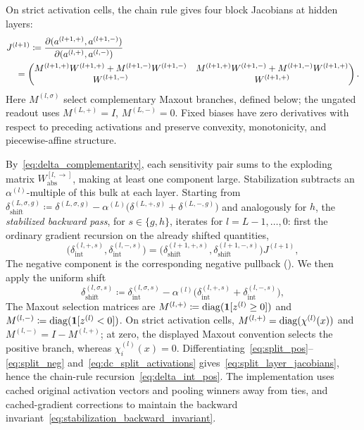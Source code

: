 On strict activation cells, the chain rule gives four block Jacobians at hidden layers:
\begin{equation}
\begin{aligned}
&J^{(l+1)}\coloneqq\frac{\partial(a^{(l+1,+)},a^{(l+1,-)})}{\partial(a^{(l,+)},a^{(l,-)})}\\
&\quad=\begin{pmatrix}
M^{(l+1,+)}W^{(l+1,+)}+M^{(l+1,-)}W^{(l+1,-)}
& M^{(l+1,+)}W^{(l+1,-)}+M^{(l+1,-)}W^{(l+1,+)}\\
W^{(l+1,-)} & W^{(l+1,+)}
\end{pmatrix}.
\end{aligned}
\label{eq:split_layer_jacobians}
\end{equation}
Here $M^{(l,\sigma)}$ select complementary Maxout branches, defined below; the ungated readout uses $M^{(L,+)}=I$, $M^{(L,-)}=0$. Fixed biases have zero derivatives with respect to preceding activations and preserve convexity, monotonicity, and piecewise-affine structure.

By~\eqref{eq:delta_complementarity}, each sensitivity pair sums to the exploding matrix $W_{\mathrm{abs}}^{[l, \rightarrow]}$, making at least one component large. Stabilization subtracts an $\alpha^{(l)}$-multiple of this bulk at each layer. Starting from $\delta_{\mathrm{shift}}^{(L,\sigma,g)} \coloneqq \delta^{(L,\sigma,g)} - \alpha^{(L)} \bigl( \delta^{(L,+,g)} + \delta^{(L,-,g)} \bigr)$ and analogously for $h$, the \emph{stabilized backward pass}, for $s\in\{g,h\}$, iterates for $l = L-1, \dots, 0$: first the ordinary gradient recursion on the already shifted quantities,
\begin{equation}
\bigl(\delta_{\mathrm{int}}^{(l,+,s)},\delta_{\mathrm{int}}^{(l,-,s)}\bigr)
=\bigl(\delta_{\mathrm{shift}}^{(l+1,+,s)},\delta_{\mathrm{shift}}^{(l+1,-,s)}\bigr)J^{(l+1)},
\label{eq:delta_int_pos}
\end{equation}
The negative component is the corresponding negative pullback (). We then apply the uniform shift
\begin{equation}
	\delta_{\mathrm{shift}}^{(l,\sigma,s)} \coloneqq \delta_{\mathrm{int}}^{(l,\sigma,s)} - \alpha^{(l)} \bigl( \delta_{\mathrm{int}}^{(l,+,s)} + \delta_{\mathrm{int}}^{(l,-,s)} \bigr),
	\label{eq:delta_shift_def}
\end{equation}
The Maxout selection matrices are $M^{(l,+)}\coloneqq\operatorname{diag}(\mathbf{1}[z^{(l)}\ge0])$ and $M^{(l,-)}\coloneqq\operatorname{diag}(\mathbf{1}[z^{(l)}<0])$. On strict activation cells, $M^{(l,+)}=\operatorname{diag}(\chi^{(l)}(x))$ and $M^{(l,-)}=I-M^{(l,+)}$; at zero, the displayed Maxout convention selects the positive branch, whereas $\chi^{(l)}_i(x)=0$. Differentiating~\eqref{eq:split_pos}--\eqref{eq:split_neg} and~\eqref{eq:dc_split_activations} gives~\eqref{eq:split_layer_jacobians}, hence the chain-rule recursion~\eqref{eq:delta_int_pos}. The implementation uses cached original activation vectors and pooling winners away from ties, and cached-gradient corrections to maintain the backward invariant~\eqref{eq:stabilization_backward_invariant}.

